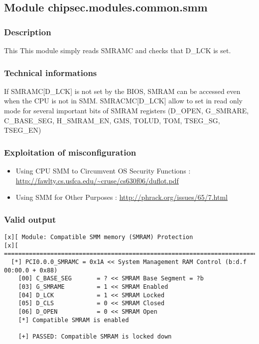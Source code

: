 \hypertarget{module-chipsec.modules.common.smm}{%
\subsection{Module
chipsec.modules.common.smm}\label{module-chipsec.modules.common.smm}}

\hypertarget{description-7}{%
\subsubsection{Description}\label{description-7}}

This This module simply reads SMRAMC and checks that D\_LCK is set.

\hypertarget{technical-informations-7}{%
\subsubsection{Technical informations}\label{technical-informations-7}}

If SMRAMC{[}D\_LCK{]} is not set by the BIOS, SMRAM can be accessed even
when the CPU is not in SMM. SMRACMC{[}D\_LCK{]} allow to set in read
only mode for several important bits of SMRAM registers (D\_OPEN,
G\_SMRARE, C\_BASE\_SEG, H\_SMRAM\_EN, GMS, TOLUD, TOM, TSEG\_SG,
TSEG\_EN)

\hypertarget{exploitation-of-misconfiguration-3}{%
\subsubsection{Exploitation of
misconfiguration}\label{exploitation-of-misconfiguration-3}}

\begin{itemize}
\tightlist
\item
  Using CPU SMM to Circumvent OS Security Functions :
  \url{http://fawlty.cs.usfca.edu/~cruse/cs630f06/duflot.pdf}
\item
  Using SMM for Other Purposes :
  \url{http://phrack.org/issues/65/7.html}
\end{itemize}

\hypertarget{valid-output-7}{%
\subsubsection{Valid output}\label{valid-output-7}}

\begin{verbatim}
[x][ Module: Compatible SMM memory (SMRAM) Protection
[x][ =======================================================================
  [*] PCI0.0.0_SMRAMC = 0x1A << System Management RAM Control (b:d.f 00:00.0 + 0x88)
    [00] C_BASE_SEG       = ? << SMRAM Base Segment = ?b 
    [03] G_SMRAME         = 1 << SMRAM Enabled 
    [04] D_LCK            = 1 << SMRAM Locked 
    [05] D_CLS            = 0 << SMRAM Closed 
    [06] D_OPEN           = 0 << SMRAM Open 
    [*] Compatible SMRAM is enabled
    
    [+] PASSED: Compatible SMRAM is locked down
\end{verbatim}

